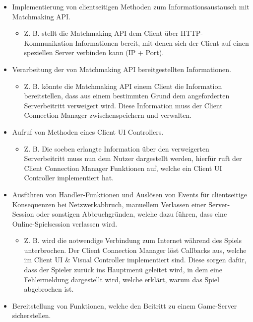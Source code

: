  \begin{itemize}
	\item Implementierung von clientseitigen Methoden zum Informationsaustausch mit Matchmaking API.
	\begin{itemize}
		\item Z. B. stellt die Matchmaking API dem Client über HTTP-Kommunikation Informationen bereit, mit denen sich der Client auf einen speziellen Server verbinden kann (IP + Port). \cite{Wikipedia.2021d} \cite{Wikipedia.2021e}
	\end{itemize}
	\item Verarbeitung der von Matchmaking API bereitgestellten Informationen. 
	\begin{itemize}
		\item Z. B. könnte die Matchmaking API einem Client die Information bereitstellen, dass aus einem bestimmten Grund dem angeforderten Serverbeitritt verweigert wird. Diese Information muss der Client Connection Manager zwischenspeichern und verwalten.
	\end{itemize}
	\item Aufruf von Methoden eines Client UI Controllers.
	\begin{itemize}
		\item Z. B. Die soeben erlangte Information über den verweigerten Serverbeitritt muss nun dem Nutzer dargestellt werden, hierfür ruft der Client Connection Manager Funktionen auf, welche ein Client UI Controller implementiert hat.
	\end{itemize}
	\item Ausführen von Handler-Funktionen und Auslösen von Events für clientseitige Konsequenzen bei Netzwerkabbruch, manuellem Verlassen einer Server-Session oder sonstigen Abbruchgründen, welche dazu führen, dass eine Online-Spielsession verlassen wird.
	\begin{itemize}
		\item Z. B. wird die notwendige Verbindung zum Internet während des Spiels unterbrochen. Der Client Connection Manager löst Callbacks aus, welche im Client UI \& Visual Controller implementiert sind. Diese sorgen dafür, dass der Spieler zurück ins Hauptmenü geleitet wird, in dem eine Fehlermeldung dargestellt wird, welche erklärt, warum das Spiel abgebrochen ist.
	\end{itemize}
	\item Bereitstellung von Funktionen, welche den Beitritt zu einem Game-Server sicherstellen.
\end{itemize}


